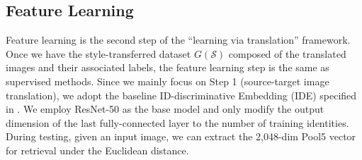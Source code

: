 \documentclass[10pt,twocolumn,letterpaper]{article}
\begin{document}
\subsection{Feature Learning}\label{sec:feature_learning}
Feature learning is the second step of the ``learning via translation'' framework. Once we have the style-transferred dataset $G(\mathcal{S})$ composed of the translated images and their associated labels, the feature learning step is the same as supervised methods. Since we mainly focus on Step 1 (source-target image translation), we adopt the baseline ID-discriminative Embedding (IDE) specified in \cite{DBLP:journals/corr/ZhengYH16}. We employ ResNet-50 \cite{DBLP:conf/cvpr/HeZRS16} as the base model and only modify the output dimension of the last fully-connected layer to the number of training identities. During testing, given an input image, we can extract the 2,048-dim Pool5 vector for retrieval under the Euclidean distance.
\end{document}
